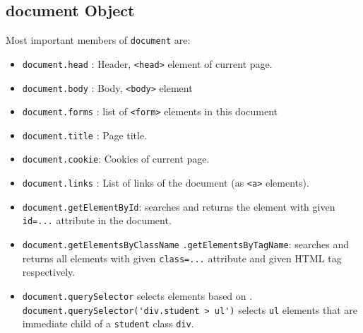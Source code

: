 \documentclass[trans,compress,xcolor=table]{beamer}
\begin{document}
\subsection*{document Object}
\begin{frame}[fragile]
Most important members of \lstinline!document! are:
\begin{itemize}
\item \lstinline!document.head! : Header, \lstinline!<head>! element
	of current page.
\item \lstinline!document.body! : Body, \lstinline!<body>! element
\item \lstinline!document.forms! : list of \lstinline!<form>! elements in this document
\item \lstinline!document.title! : Page title.
\item \lstinline!document.cookie!: Cookies of current page.
\item \lstinline!document.links! : List of links of the document (as \lstinline!<a>! elements).
\item \lstinline!document.getElementById!: searches and returns 
the element with given \lstinline!id=...! attribute in the document.
\item \lstinline!document.getElementsByClassName! 
\lstinline!.getElementsByTagName!: searches and returns all elements with given \lstinline!class=...! attribute and given HTML tag respectively.
\item \lstinline!document.querySelector! selects elements based on .
\lstinline!document.querySelector('div.student > ul')! selects \lstinline!ul! elements that are immediate child of a \lstinline!student! class \lstinline!div!.
\end{itemize}
\end{frame}
\end{document}
